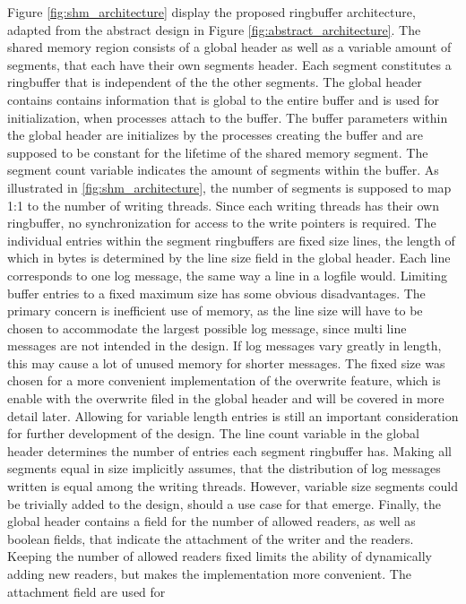 Figure \ref{fig:shm_architecture} display the proposed ringbuffer architecture, adapted from the abstract design in Figure \ref{fig:abstract_architecture}.
The shared memory region consists of a global header as well as a variable amount of segments,
that each have their own segments header. Each segment constitutes a ringbuffer that is independent of the
the other segments. The global header contains contains information that is global to
the entire buffer and is used for initialization, when processes attach to the buffer. The buffer parameters within the global
header are initializes by the processes creating the buffer and are supposed to be constant for the lifetime of the shared memory segment.
The segment count variable indicates the amount of segments within the buffer. As illustrated
in \ref{fig:shm_architecture}, the number of segments is supposed to map 1:1 to the number 
of writing threads. Since each writing threads has their own ringbuffer, no synchronization for access
to the write pointers is required. The individual entries within the segment ringbuffers are fixed
size lines, the length of which in bytes is determined by the line size field in the global header. Each line corresponds
to one log message, the same way a line in a logfile would.  
Limiting buffer entries to a fixed maximum size has some obvious disadvantages. The primary concern
is inefficient use of memory, as the line size will have to be chosen to accommodate the largest possible log message, since multi line
messages are not intended in the design. If log messages vary greatly in length, this may cause a lot of unused memory
for shorter messages. The fixed size was chosen for a more convenient implementation of the overwrite feature, which is enable with the overwrite filed in the global header and will be covered in more detail
later. Allowing for variable length entries is still an important consideration for further development of the design. The line count variable in the global header 
determines the number of entries each segment ringbuffer has. Making all segments equal in size implicitly assumes, that the distribution of log messages written
is equal among the writing threads. However, variable size segments could be trivially added to the design, should a use case for that emerge. 
Finally, the global header contains a field for the number of allowed readers, as well as boolean fields, that indicate the attachment of the writer and the readers.
Keeping the number of allowed readers fixed limits the ability of dynamically adding new readers, but makes the implementation more convenient. The attachment field are used for
